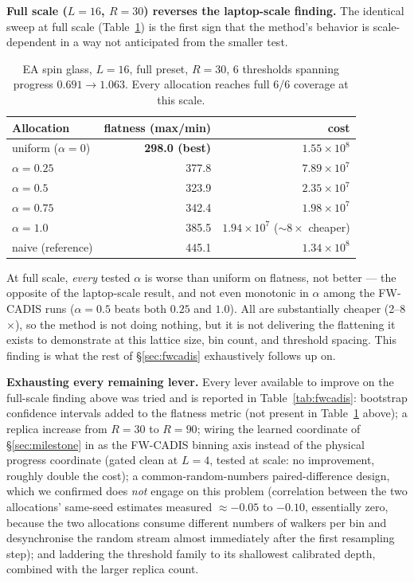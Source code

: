 \documentclass[a4paper,fleqn]{cas-sc}
\begin{document}
\textbf{Full scale ($L=16$, $R=30$) reverses the laptop-scale finding.} The identical sweep
at full scale (Table~\ref{tab:fwfull}) is the first sign that the method's behavior is
scale-dependent in a way not anticipated from the smaller test.

\begin{table}[H]
\centering\small
\caption{EA spin glass, $L=16$, full preset, $R=30$, 6 thresholds spanning progress
	$0.691\to1.063$. Every allocation reaches full 6/6 coverage at this scale.}
\label{tab:fwfull}
\begin{tabular}{lrr}
	\toprule
	Allocation & flatness (max/min) & cost \\
	\midrule
	uniform ($\alpha=0$) & \textbf{298.0 (best)} & $1.55\times10^{8}$ \\
	$\alpha=0.25$ & 377.8 & $7.89\times10^{7}$ \\
	$\alpha=0.5$ & 323.9 & $2.35\times10^{7}$ \\
	$\alpha=0.75$ & 342.4 & $1.98\times10^{7}$ \\
	$\alpha=1.0$ & 385.5 & $1.94\times10^{7}$ ($\sim\!8\times$ cheaper) \\
	naive (reference) & 445.1 & $1.34\times10^{8}$ \\
	\bottomrule
\end{tabular}
\end{table}

At full scale, \emph{every} tested $\alpha$ is worse than uniform on flatness, not better
--- the opposite of the laptop-scale result, and not even monotonic in $\alpha$ among the
FW-CADIS runs ($\alpha=0.5$ beats both $0.25$ and $1.0$). All are substantially cheaper
(2--8$\times$), so the method is not doing nothing, but it is not delivering the flattening
it exists to demonstrate at this lattice size, bin count, and threshold spacing. This
finding is what the rest of \S\ref{sec:fwcadis} exhaustively follows up on.

\textbf{Exhausting every remaining lever.} Every lever available to improve on the full-scale
finding above was tried and is reported in Table~\ref{tab:fwcadis}: bootstrap confidence
intervals added to the flatness metric (not present in Table~\ref{tab:fwfull} above); a
replica increase from $R=30$ to $R=90$; wiring the learned coordinate of
\S\ref{sec:milestone} in as the FW-CADIS binning axis instead of the physical progress
coordinate (gated clean at $L=4$, tested at scale: no improvement, roughly double the
cost); a common-random-numbers paired-difference design, which we confirmed does
\emph{not} engage on this problem (correlation between the two allocations'
same-seed estimates measured $\approx-0.05$ to $-0.10$, essentially zero, because the two
allocations consume different numbers of walkers per bin and desynchronise the random
stream almost immediately after the first resampling step); and laddering the threshold
family to its shallowest calibrated depth, combined with the larger replica count.
\end{document}
